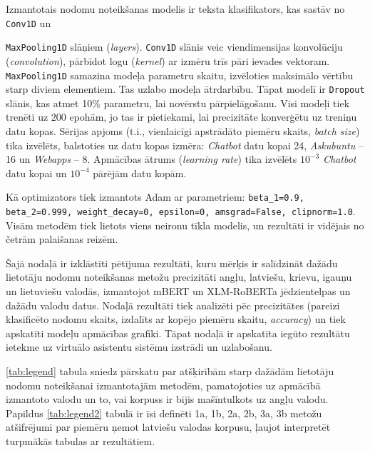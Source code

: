 
Izmantotais nodomu noteikšanas modelis ir teksta klasifikators, kas sastāv no \texttt{Conv1D} un 

\texttt{MaxPooling1D} slāņiem (\textit{layers}). \texttt{Conv1D} slānis veic viendimensijas konvolūciju (\textit{convolution}), pārbīdot logu (\textit{kernel}) ar izmēru trīs pāri ievades vektoram. \texttt{MaxPooling1D} samazina modeļa parametru skaitu, izvēloties maksimālo vērtību starp diviem elementiem. Tas uzlabo modeļa ātrdarbību. Tāpat modelī ir \texttt{Dropout} slānis, kas atmet 10\% parametru, lai novērstu pārpielāgošanu. Visi modeļi tiek trenēti uz 200 epohām, jo tas ir pietiekami, lai precizitāte konverģētu uz treniņu datu kopas. Sērijas apjoms (t.i., vienlaicīgi apstrādāto piemēru skaits, \textit{batch size}) tika izvēlēts, balstoties uz datu kopas izmēra: \textit{Chatbot} datu kopai 24, \textit{Askubuntu} -- 16 un \textit{Webapps} -- 8. Apmācības ātrums (\textit{learning rate}) tika izvēlēts $10^{-3}$ \textit{Chatbot} datu kopai un $10^{-4}$ pārējām datu kopām.

Kā optimizators tiek izmantots Adam ar parametriem: \texttt{beta\_1=0.9, beta\_2=0.999, weight\_decay=0, epsilon=0, amsgrad=False, clipnorm=1.0}. Visām metodēm tiek lietots viens neironu tīkla modelis, un rezultāti ir vidējais no četrām palaišanas reizēm.


Šajā nodaļā ir izklāstīti pētījuma rezultāti, kuru mērķis ir salīdzināt dažādu lietotāju nodomu noteikšanas metožu precizitāti angļu, latviešu, krievu, igauņu un lietuviešu valodās, izmantojot mBERT un XLM-RoBERTa jēdzientelpas un dažādu valodu datus. Nodaļā rezultāti tiek analizēti pēc precizitātes (pareizi klasificēto nodomu skaits, izdalīts ar kopējo piemēru skaitu, \textit{accuracy}) un tiek apskatīti modeļu apmācības grafiki. Tāpat nodaļā ir apskatīta iegūto rezultātu ietekme uz virtuālo asistentu sistēmu izstrādi un uzlabošanu.

\ref{tab:legend} tabula sniedz pārskatu par atšķirībām starp dažādām lietotāju nodomu noteikšanai izmantotajām metodēm, pamatojoties uz apmācībā izmantoto valodu un to, vai korpuss ir bijis mašīntulkots uz angļu valodu. Papildus \ref{tab:legend2} tabulā ir īsi definēti 1a, 1b, 2a, 2b, 3a, 3b metožu atšifrējumi par piemēru ņemot latviešu valodas korpusu, ļaujot interpretēt turpmākās tabulas ar rezultātiem.


